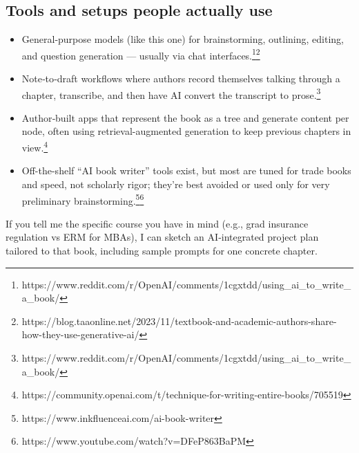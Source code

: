 \documentclass[
  11pt,
]{article}
\providecommand{\tightlist}{%
  \setlength{\itemsep}{0pt}\setlength{\parskip}{0pt}}
\begin{document}
\subsection{Tools and setups people actually use}\label{tools-and-setups-people-actually-use}

\begin{itemize}
\tightlist
\item
  General-purpose models (like this one) for brainstorming, outlining, editing, and question generation --- usually via chat interfaces.\footnote{https://www.reddit.com/r/OpenAI/comments/1cgxtdd/using\_ai\_to\_write\_a\_book/}\footnote{https://blog.taaonline.net/2023/11/textbook-and-academic-authors-share-how-they-use-generative-ai/}
\item
  Note‑to‑draft workflows where authors record themselves talking through a chapter, transcribe, and then have AI convert the transcript to prose.\footnote{https://www.reddit.com/r/OpenAI/comments/1cgxtdd/using\_ai\_to\_write\_a\_book/}
\item
  Author‑built apps that represent the book as a tree and generate content per node, often using retrieval-augmented generation to keep previous chapters in view.\footnote{https://community.openai.com/t/technique-for-writing-entire-books/705519}
\item
  Off-the-shelf ``AI book writer'' tools exist, but most are tuned for trade books and speed, not scholarly rigor; they're best avoided or used only for very preliminary brainstorming.\footnote{https://www.inkfluenceai.com/ai-book-writer}\footnote{https://www.youtube.com/watch?v=DFeP863BaPM}
\end{itemize}

If you tell me the specific course you have in mind (e.g., grad insurance regulation vs ERM for MBAs), I can sketch an AI‑integrated project plan tailored to that book, including sample prompts for one concrete chapter.
\end{document}

